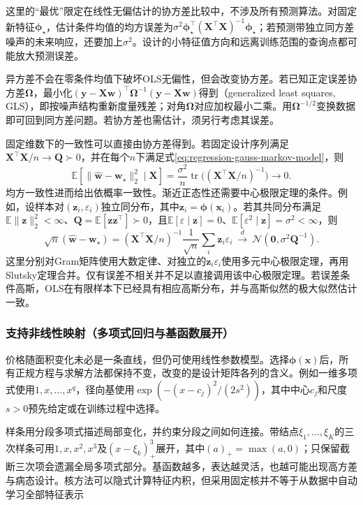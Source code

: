 这里的“最优”限定在线性无偏估计的协方差比较中，不涉及所有预测算法。对固定新特征$\bm{\phi}_{\star}$，估计条件均值的均方误差为$\sigma^2\bm{\phi}_{\star}^{\top}(\bm{X}^{\top}\bm{X})^{-1}\bm{\phi}_{\star}$；若预测带独立同方差噪声的未来响应，还要加上$\sigma^2$。设计的小特征值方向和远离训练范围的查询点都可能放大预测误差。

异方差不会在零条件均值下破坏OLS无偏性，但会改变协方差。若已知正定误差协方差$\bm{\Omega}$，最小化$(\bm{y}-\bm{X}\bm{w})^{\top}\bm{\Omega}^{-1}(\bm{y}-\bm{X}\bm{w})$得到（generalized least squares, GLS），即按噪声结构重新度量残差；对角$\bm{\Omega}$对应加权最小二乘。用$\bm{\Omega}^{-1/2}$变换数据即可回到同方差问题。若协方差也需估计，须另行考虑其误差。

固定维数下的一致性可以直接由协方差得到。若固定设计序列满足$\bm{X}^{\top}\bm{X}/n\to\bm{Q}\succ0$，并在每个$n$下满足式\eqref{eq:regression-gauss-markov-model}，则
\[
  \mathbb{E}[\lVert\widehat{\bm{w}}-\bm{w}_{\star}\rVert_2^2\mid\bm{X}]
  =\frac{\sigma^2}{n}\operatorname{tr}
       \bigl((\bm{X}^{\top}\bm{X}/n)^{-1}\bigr)\longrightarrow0.
\]
均方一致性进而给出依概率一致性。渐近正态性还需要中心极限定理的条件。例如，设样本对$(\bm{z}_i,\varepsilon_i)$独立同分布，其中$\bm{z}_i=\bm{\phi}(\bm{x}_i)$。若其共同分布满足$\mathbb{E}\lVert\bm{z}\rVert_2^2<\infty$、$\bm{Q}=\mathbb{E}[\bm{z}\bm{z}^{\top}]\succ0$，且$\mathbb{E}[\varepsilon\mid\bm{z}]=0$、$\mathbb{E}[\varepsilon^2\mid\bm{z}]=\sigma^2<\infty$，则
\[
  \sqrt n(\widehat{\bm{w}}-\bm{w}_{\star})
  =
  (\bm{X}^{\top}\bm{X}/n)^{-1}
  \frac{1}{\sqrt n}\sum_i\bm{z}_i\varepsilon_i
  \ \xrightarrow{d}\ \mathcal{N}(\bm{0},\sigma^2\bm{Q}^{-1}).
\]
这里分别对Gram矩阵使用大数定律、对独立的$\bm{z}_i\varepsilon_i$使用多元中心极限定理，再用Slutsky定理合并。仅有误差不相关并不足以直接调用该中心极限定理。若误差条件高斯，OLS在有限样本下已经具有相应高斯分布，并与高斯似然的极大似然估计一致。

\subsubsection{支持非线性映射（多项式回归与基函数展开）}
\label{sec:regression-basis}

价格随面积变化未必是一条直线，但仍可使用线性参数模型。选择$\bm{\phi}(\bm{x})$后，所有正规方程与求解方法都保持不变，改变的是设计矩阵各列的含义。例如一维多项式使用$1,x,\ldots,x^q$，径向基使用$\exp(-(x-c_j)^2/(2s^2))$，其中中心$c_j$和尺度$s>0$预先给定或在训练过程中选择。

样条用分段多项式描述局部变化，并约束分段之间如何连接。带结点$\xi_1,\ldots,\xi_K$的三次样条可用$1,x,x^2,x^3$及$(x-\xi_k)_+^3$展开，其中$(a)_+=\max(a,0)$；只保留截断三次项会遗漏全局多项式部分。基函数越多，表达越灵活，也越可能出现高方差与病态设计。核方法可以隐式计算特征内积，但采用固定核并不等于从数据中自动学习全部特征表示

